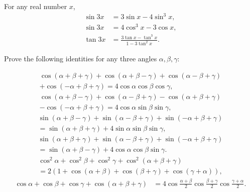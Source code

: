 \begin{tcolorbox}[title={Triple--Angle Identities}]
\begin{identity}
    For any real number $x$,
    \begin{align}
        \sin 3x &= 3\sin x - 4\sin^3 x,\\
        \sin 3x &= 4\cos^3 x - 3\cos x,\\
        \tan 3x &= \frac{3\tan x - \tan^3 x}{1 - 3\tan^2 x}.
    \end{align}
\end{identity}
\end{tcolorbox}

\begin{question}
    Prove the following identities for any three angles $\alpha, \beta, \gamma$:
    \begin{tasks}
        \task \begin{multline*}
        \cos(\alpha+\beta+\gamma)+\cos(\alpha+\beta-\gamma)+\cos(\alpha-\beta+\gamma)\\+\cos(-\alpha+\beta+\gamma)  = 4\cos \alpha \cos \beta \cos \gamma,
    \end{multline*}
    \task \begin{multline*}
        \cos(\alpha+\beta-\gamma)+\cos(\alpha-\beta+\gamma)-\cos(\alpha+\beta+\gamma) \\- \cos(-\alpha+\beta+\gamma) = 4\cos \alpha \sin \beta \sin \gamma,
    \end{multline*}
    \task \begin{multline*}
        \sin(\alpha+\beta-\gamma)+\sin(\alpha-\beta+\gamma)+\sin(-\alpha+\beta+\gamma) \\= \sin(\alpha+\beta+\gamma) + 4\sin \alpha \sin \beta \sin \gamma,
    \end{multline*}
    \task \begin{multline*}
        \sin(\alpha+\beta+\gamma)+\sin(\alpha-\beta+\gamma)+\sin(-\alpha+\beta+\gamma) \\= \sin(\alpha+\beta-\gamma) + 4\cos \alpha \cos \beta \sin \gamma.
    \end{multline*}
    \task \begin{multline*}
        \cos^2 \alpha + \cos^2 \beta + \cos^2 \gamma + \cos^2(\alpha+\beta+\gamma) \\= 2\left(1+\cos(\alpha+\beta)+\cos(\beta+\gamma)+\cos(\gamma+\alpha)\right),
    \end{multline*}
    \task \begin{align*}
        \cos \alpha + \cos \beta + \cos \gamma + \cos(\alpha+\beta+\gamma) &= 4\cos\frac{\alpha+\beta}{2}\cos\frac{\beta+\gamma}{2}\cos\frac{\gamma+\alpha}{2}.\\
    \end{align*}
    \end{tasks}
\end{question}


